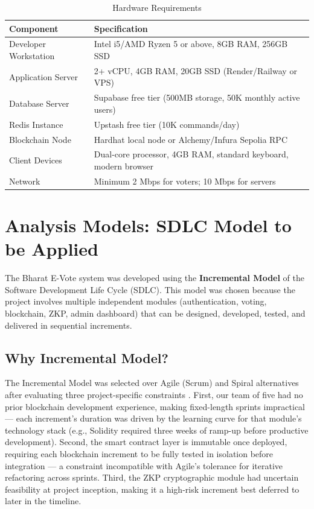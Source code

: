 \documentclass[oneside,a4paper,12pt]{book}
\begin{document}
\begin{table}[htbp]
\centering
\renewcommand{\arraystretch}{1.2}
\small
\begin{tabularx}{\textwidth}{|p{4cm}|X|}
\hline
\textbf{Component} & \textbf{Specification} \\
\hline
Developer Workstation & Intel i5/AMD Ryzen 5 or above, 8GB RAM, 256GB SSD \\
\hline
Application Server & 2+ vCPU, 4GB RAM, 20GB SSD (Render/Railway or VPS) \\
\hline
Database Server & Supabase free tier (500MB storage, 50K monthly active users) \\
\hline
Redis Instance & Upstash free tier (10K commands/day) \\
\hline
Blockchain Node & Hardhat local node or Alchemy/Infura Sepolia RPC \\
\hline
Client Devices & Dual-core processor, 4GB RAM, standard keyboard, modern browser \\
\hline
Network & Minimum 2 Mbps for voters; 10 Mbps for servers \\
\hline
\end{tabularx}
\caption{Hardware Requirements}
\label{tab:hw_req}
\end{table}

\section{Analysis Models: SDLC Model to be Applied}

The Bharat E-Vote system was developed using the \textbf{Incremental Model} of the Software Development Life Cycle (SDLC). This model was chosen because the project involves multiple independent modules (authentication, voting, blockchain, ZKP, admin dashboard) that can be designed, developed, tested, and delivered in sequential increments.

\subsection{Why Incremental Model?}
The Incremental Model was selected over Agile (Scrum) and Spiral alternatives after evaluating three project-specific constraints \cite{pressman2020}. First, our team of five had no prior blockchain development experience, making fixed-length sprints impractical --- each increment's duration was driven by the learning curve for that module's technology stack (e.g., Solidity required three weeks of ramp-up before productive development). Second, the smart contract layer is immutable once deployed, requiring each blockchain increment to be fully tested in isolation before integration --- a constraint incompatible with Agile's tolerance for iterative refactoring across sprints. Third, the ZKP cryptographic module had uncertain feasibility at project inception, making it a high-risk increment best deferred to later in the timeline.
\end{document}
